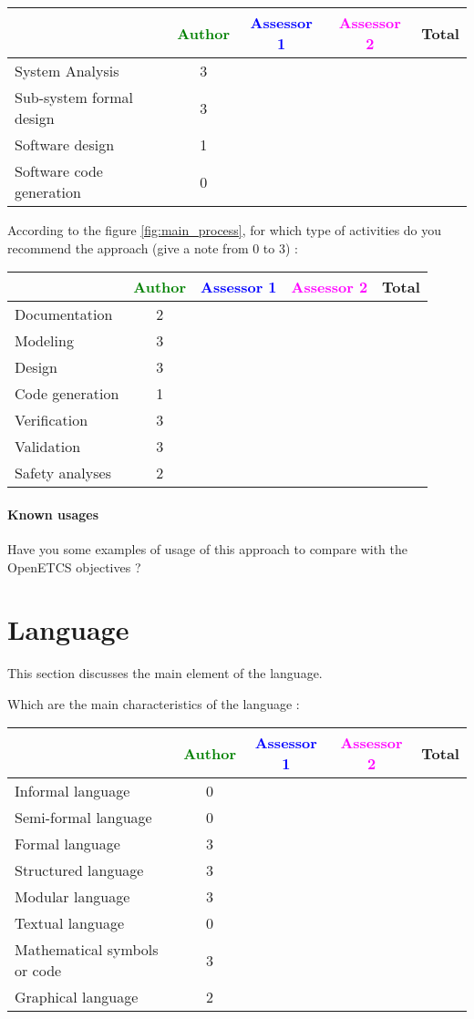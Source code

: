 \begin{tabular}{|l | c | c | c | c|}
\hline
& \textcolor{green}{Author} & \textcolor{blue}{Assessor 1} & \textcolor{magenta}{Assessor 2} & Total \\
\hline 
System Analysis & 3 & & &  \\
\hline
Sub-system formal design & 3 & & & \\
\hline
Software design & 1 & & & \\
\hline
Software code generation & 0 & & & \\
\hline
\end{tabular}

According to the figure \ref{fig:main_process}, for which type of activities do you recommend the approach (give a note from 0 to  3) :

\begin{tabular}{|l | c | c | c | c|}
\hline
& \textcolor{green}{Author} & \textcolor{blue}{Assessor 1} & \textcolor{magenta}{Assessor 2} & Total \\
\hline 
Documentation & 2 & & &  \\
\hline
Modeling & 3 & & &  \\
\hline
Design & 3 & & & \\
\hline
Code generation & 1 & & & \\
\hline
Verification & 3 & & & \\
\hline
Validation & 3 & & & \\
\hline
Safety analyses & 2 & & & \\
\hline
\end{tabular}

\paragraph{Known usages} Have you some examples of usage of this approach to  compare with the OpenETCS objectives ?

\section{Language}
This section discusses the main element of the language.

Which are the main characteristics of the language :

\begin{tabular}{|l | c | c | c | c|}
\hline
& \textcolor{green}{Author} & \textcolor{blue}{Assessor 1} & \textcolor{magenta}{Assessor 2} & Total \\
\hline 
Informal language & 0 & & &  \\
\hline 
Semi-formal language & 0 & & &  \\
\hline
Formal language & 3 & & &  \\
\hline
Structured language & 3 & & & \\
\hline
Modular language & 3 & & & \\
\hline
Textual language & 0 & & & \\
\hline
Mathematical symbols or code & 3 & & & \\
\hline
Graphical language & 2 & & & \\
\hline
\end{tabular}

